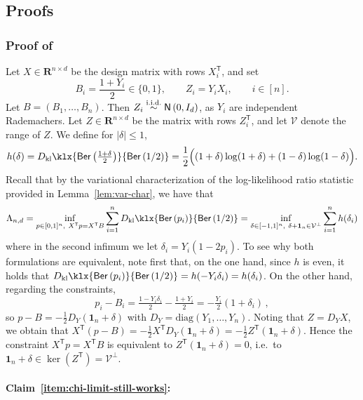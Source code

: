 \documentclass[11pt, letterpaper, hidelinks]{article}
\newcommand{\R}{\mathbf R}
\newcommand{\cV}{\mathcal{V}}
\newcommand{\1}{\mathbf 1}
\newcommand{\half}{\frac12}
\renewcommand{\leq}{\leqslant}
\newcommand{\T}{\mathsf{T}}
\newcommand{\kl}{D_{\rm kl}\klx}
\newcommand{\iid}{\textnormal{i.i.d.}}
\newcommand{\simiid}{\stackrel{\iid}{\sim}}
\theoremstyle{plain}
\theoremstyle{definition}
\newcommand{\Normal}[2]{\mathsf{N}\left(#1, #2\right)}
\newcommand{\defn}{=}
\newcommand{\Ber}[1]{\mathsf{Ber}\left(#1\right)}
\begin{document}
\subsection{Proofs}
\label{sec:proofs-sharpness}
\subsubsection{Proof of~}
\label{sec:proof-prop-chi-limit-behavior}

Let $X\in \R^{n\times d}$ be the design matrix with rows $X_i^\T$, and set
\[
B_i \defn \frac{1+Y_i}{2}\in\{0,1\},
\qquad
Z_i \defn Y_i X_i,
\qquad
i\in[n].
\]
Let $B=(B_1,\ldots,B_n)$. Then $Z_i \simiid \Normal{0}{I_d}$, as $Y_i$ are independent Rademachers. Let $Z\in \R^{n\times d}$ be the matrix with rows $Z_i^\T$, and let $\cV$ denote the range 
of $Z$. 
We define for $|\delta| \leq 1$, 
\[
h(\delta) = \kl{\Ber{\tfrac{1 + \delta}{2}}}{\Ber{1/2}} = \half \Big( (1+\delta) \log(1+\delta) + (1-\delta) \log(1-\delta)\Big).
\]
Recall that by the variational characterization of the log-likelihood ratio statistic provided in Lemma~\ref{lem:var-char}, we have that 
\begin{equation}\label{eqn:var-char-llr}
\Lambda_{n,d}
=
\inf_{p \in [0, 1]^n,\ X^\T p = X^\T B}
\sum_{i=1}^n \kl{\Ber{p_i}}{\Ber{1/2}}
= 
\inf_{\delta \in [-1, 1]^n,\ \delta + \mathbf{1}_n \in \cV^\perp}
\sum_{i=1}^n h(\delta_i)
\end{equation}
where in the second infimum we let $\delta_i \defn Y_i(1-2p_i)$. To see why both formulations are equivalent, note first that, on the one hand, since $h$ is even, it holds that
$\kl{\Ber{p_i}}{\Ber{1/2}}=h(-Y_i\delta_i)=h(\delta_i)$.
On the other hand, regarding the constraints,
\[
p_i-B_i=\tfrac{1-Y_i\delta_i}{2}-\tfrac{1+Y_i}{2}=-\tfrac{Y_i}{2}(1+\delta_i)\, ,
\]
so $p-B=-\tfrac12 D_Y(\1_n+\delta)$ with $D_Y=\mathrm{diag}(Y_1,\dots,Y_n)$. Noting that $Z=D_Y X$, we obtain that $X^\T(p-B)=-\tfrac12 X^\T D_Y(\1_n+\delta)=-\tfrac12 Z^\T(\1_n+\delta)$. Hence the constraint $X^\T p=X^\T B$ is equivalent to $Z^\T(\1_n+\delta)=0$, i.e.\ to $\1_n+\delta\in\ker(Z^\T)=\cV^\perp$.

\paragraph{Claim~\ref{item:chi-limit-still-works}:}
\end{document}
